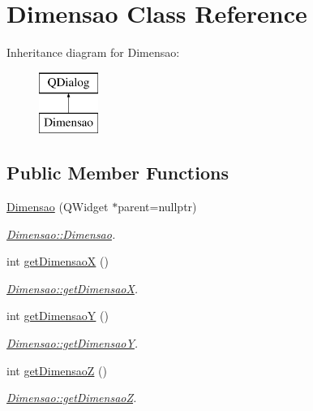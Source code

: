 \hypertarget{classDimensao}{}\section{Dimensao Class Reference}
\label{classDimensao}
Inheritance diagram for Dimensao\+:\begin{figure}[H]
\begin{center}
\leavevmode
\includegraphics[height=2.000000cm]{classDimensao}
\end{center}
\end{figure}
\subsection*{Public Member Functions}
\begin{DoxyCompactItemize}
\item 
\mbox{\hyperlink{classDimensao_a628f34e3842d94b42fc81b30e5652705}{Dimensao}} (Q\+Widget $\ast$parent=nullptr)
\begin{DoxyCompactList}\small\item\em \mbox{\hyperlink{classDimensao_a628f34e3842d94b42fc81b30e5652705}{Dimensao\+::\+Dimensao}}. \end{DoxyCompactList}\item 
int \mbox{\hyperlink{classDimensao_a212470bd9d76fd1fb31ba816109045d2}{get\+DimensaoX}} ()
\begin{DoxyCompactList}\small\item\em \mbox{\hyperlink{classDimensao_a212470bd9d76fd1fb31ba816109045d2}{Dimensao\+::get\+DimensaoX}}. \end{DoxyCompactList}\item 
int \mbox{\hyperlink{classDimensao_a5141fbeb3e622165a1b0a521c5974082}{get\+DimensaoY}} ()
\begin{DoxyCompactList}\small\item\em \mbox{\hyperlink{classDimensao_a5141fbeb3e622165a1b0a521c5974082}{Dimensao\+::get\+DimensaoY}}. \end{DoxyCompactList}\item 
int \mbox{\hyperlink{classDimensao_a6a548c7d1634f8b593241c68c74b83c7}{get\+DimensaoZ}} ()
\begin{DoxyCompactList}\small\item\em \mbox{\hyperlink{classDimensao_a6a548c7d1634f8b593241c68c74b83c7}{Dimensao\+::get\+DimensaoZ}}. \end{DoxyCompactList}\end{DoxyCompactItemize}


